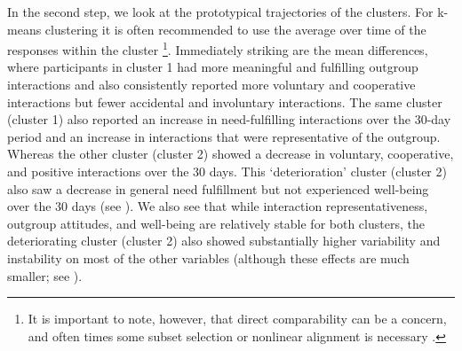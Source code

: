 In the second step, we look at the prototypical trajectories of the
clusters. For k-means clustering it is often recommended to use the
average over time of the responses within the cluster
\citep[see ;][]{niennattrakul2007}\footnote{It is important to note, however, that direct comparability can be a concern, and often times some subset selection or nonlinear alignment is necessary \citep[e.g.,][]{gupta1996}.}.
Immediately striking are the mean differences, where participants in
cluster 1 had more meaningful and fulfilling outgroup interactions and
also consistently reported more voluntary and cooperative interactions
but fewer accidental and involuntary interactions. The same cluster
(cluster 1) also reported an increase in need-fulfilling interactions
over the 30-day period and an increase in interactions that were
representative of the outgroup. Whereas the other cluster (cluster 2)
showed a decrease in voluntary, cooperative, and positive interactions
over the 30 days. This `deterioration' cluster (cluster 2) also saw a
decrease in general need fulfillment but not experienced well-being over
the 30 days (see ). We also
see that while interaction representativeness, outgroup attitudes, and
well-being are relatively stable for both clusters, the deteriorating
cluster (cluster 2) also showed substantially higher variability and
instability on most of the other variables (although these effects are
much smaller; see ).

